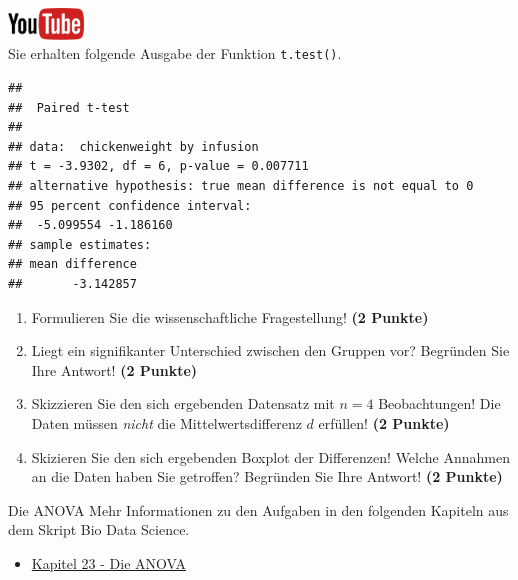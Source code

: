 \documentclass[a4paper, 10pt]{scrartcl}\usepackage[]{graphicx}\usepackage[]{xcolor}
\makeatletter
\newenvironment{kframe}{%
 \def\at@end@of@kframe{}%
 \ifinner\ifhmode%
  \def\at@end@of@kframe{\end{minipage}}%
  \begin{minipage}{\columnwidth}%
 \fi\fi%
 \def\FrameCommand##1{\hskip\@totalleftmargin \hskip-\fboxsep
 \colorbox{shadecolor}{##1}\hskip-\fboxsep
     \hskip-\linewidth \hskip-\@totalleftmargin \hskip\columnwidth}%
 \MakeFramed {\advance\hsize-\width
   \@totalleftmargin\z@ \linewidth\hsize
   \@setminipage}}%
 {\par\unskip\endMakeFramed%
 \at@end@of@kframe}
\newenvironment{knitrout}{}{} %
\makeatother
\begin{document}
\hfill\href{https://youtu.be/kHmfEmU6lrk}{\includegraphics[width =
  2cm]{img/youtube}}\\[1Ex]


Sie erhalten folgende \Rlogo Ausgabe der Funktion \texttt{t.test()}.

\begin{knitrout}
\color{fgcolor}\begin{kframe}
\begin{verbatim}
## 
## 	Paired t-test
## 
## data:  chickenweight by infusion
## t = -3.9302, df = 6, p-value = 0.007711
## alternative hypothesis: true mean difference is not equal to 0
## 95 percent confidence interval:
##  -5.099554 -1.186160
## sample estimates:
## mean difference 
##       -3.142857
\end{verbatim}
\end{kframe}
\end{knitrout}


\begin{enumerate}
  \item Formulieren Sie die wissenschaftliche Fragestellung! \textbf{(2
Punkte)}
\item Liegt ein signifikanter Unterschied zwischen den Gruppen vor?
  Begr{\"u}nden Sie Ihre Antwort! \textbf{(2 Punkte)}
\item Skizzieren Sie den sich ergebenden Datensatz mit $n = 4$
  Beobachtungen! Die Daten m{\"u}ssen \textit{nicht} die Mittelwertsdifferenz
  $d$ erf{\"u}llen! \textbf{(2 Punkte)} 
\item Skizieren Sie den sich ergebenden Boxplot der Differenzen! Welche Annahmen an die Daten haben Sie getroffen? Begr{\"u}nden Sie Ihre Antwort! \textbf{(2 Punkte)} 
\end{enumerate}
 
\clearpage
\begin{graybox}{Die ANOVA}
Mehr Informationen zu den Aufgaben in den folgenden Kapiteln aus dem Skript Bio Data Science.
  \begin{itemize}
  \item \href{https://jkruppa.github.io/stat-tests-anova.html}{Kapitel 23 - Die ANOVA}
  \end{itemize}
\end{graybox}
\clearpage
\end{document}
